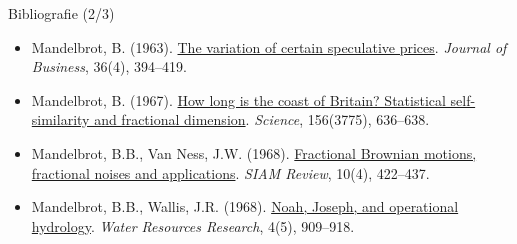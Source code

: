 \begin{frame}{Bibliografie (2/3)}
\begin{itemize}
    \item Mandelbrot, B. (1963). \href{https://doi.org/10.1086/294632}{The variation of certain speculative prices}. \textit{Journal of Business}, 36(4), 394--419.
    \item Mandelbrot, B. (1967). \href{https://doi.org/10.1126/science.156.3775.636}{How long is the coast of Britain? Statistical self-similarity and fractional dimension}. \textit{Science}, 156(3775), 636--638.
    \item Mandelbrot, B.B., Van Ness, J.W. (1968). \href{https://doi.org/10.1137/1010093}{Fractional Brownian motions, fractional noises and applications}. \textit{SIAM Review}, 10(4), 422--437.
    \item Mandelbrot, B.B., Wallis, J.R. (1968). \href{https://doi.org/10.1029/WR004i005p00909}{Noah, Joseph, and operational hydrology}. \textit{Water Resources Research}, 4(5), 909--918.
\end{itemize}
\end{frame}

